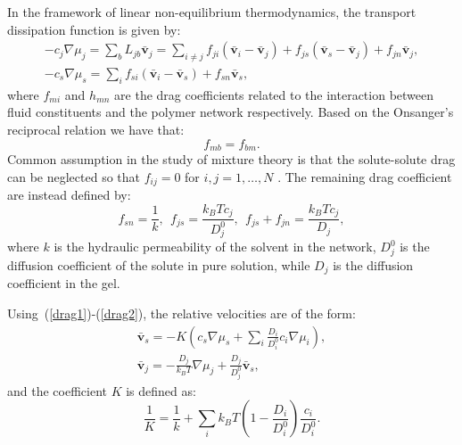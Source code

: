 \documentclass[runningheads]{llncs}
\begin{document}
In the framework of linear non-equilibrium thermodynamics, the transport dissipation function is given by:
\begin{eqnarray}
-c_j \nabla \mu_j = \sum_b L_{jb} \bar{\mathbf{v}}_j= \sum_{i\neq j} f_{ji} \left(\bar{\mathbf{v}}_i-\bar{\mathbf{v}}_j\right) + f_{js} (\bar{\mathbf{v}}_s-\bar{\mathbf{v}}_j) + f_{jn} \bar{\mathbf{v}}_j,\label{drag1}\\
-c_s \nabla \mu_s = \sum_i f_{si} \left(\bar{\mathbf{v}}_i-\bar{\mathbf{v}}_s\right)+ f_{sn} \bar{\mathbf{v}}_s,
\end{eqnarray}
where $f_{mi}$ and $h_{mn}$ are the drag coefficients related to the interaction between fluid constituents and the polymer network respectively. Based on the Onsanger's reciprocal relation we have that:
\begin{equation}
f_{mb}=f_{bm}.
\end{equation}
Common assumption in the study of mixture theory is that the solute-solute drag can be neglected so that $f_{ij}=0$ for $i,j=1,\ldots,N$ \cite{ecm1,biophysics}. The remaining drag coefficient are instead defined by:
\begin{equation}
f_{sn} = \frac{1}{k}, \ \ f_{js}=\frac{k_BT c_j}{D^0_{j}},\ \  f_{js}+f_{jn}= \frac{k_BT c_j}{D_j}, \label{drag2}
\end{equation}
where $k$ is the hydraulic permeability of the solvent in the network, $D^0_j$ is the diffusion coefficient of the solute in pure solution, while $D_j$ is the diffusion coefficient in the gel.

Using~(\ref{drag1})-(\ref{drag2}), the relative velocities are of the form:
\begin{eqnarray}
\bar{\mathbf{v}}_s = -K \left(c_s\nabla \mu_s +\sum_i \frac{D_i}{D^0_i} c_i \nabla \mu_i\right),\\
\bar{\mathbf{v}}_j = - \frac{D_j}{k_B T}\nabla \mu_j + \frac{D_j}{D^0_j} \bar{\mathbf{v}}_s, 
\end{eqnarray}
and the coefficient $K$ is defined as:
\begin{equation}
\frac{1}{K} = \frac{1}{k} + \sum_i k_B T \left(1-\frac{D_i}{D^0_i}\right) \frac{c_i}{D^0_i}.
\end{equation}
\end{document}
